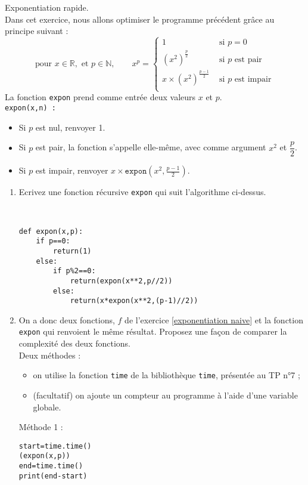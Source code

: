 \begin{exercice}\label{exp rapide}Exponentiation rapide.\\
Dans cet exercice, nous allons optimiser le programme précédent grâce au principe suivant :
\[\text{pour }x\in\mathbb{R},\text{ et }p\in \mathbb{N},\qquad x^p=\left\lbrace
\begin{array}{ll}
1&\text{ si }p=0\\
\left(x^2\right)^{\frac{p}{2}}&\text{ si }p\text{ est pair}\\
x\times \left(x^2\right)^{\frac{p-1}{2}}&\text{ si }p\text{ est impair}\\
\end{array}\right.\]
La fonction \verb?expon? prend comme entrée deux valeurs $x$ et $p$.\\
\verb?expon(x,n) : ?
\begin{itemize}
\item Si $p$ est nul, renvoyer 1.
\item Si $p$ est pair, la fonction s'appelle elle-même, avec comme argument $x^2$ et $\dfrac{p}{2}$.
\item Si $p$ est impair, renvoyer $x\times \texttt{expon}(x^2,\frac{p-1}{2})$.
\end{itemize}
\begin{enumerate}
\item Ecrivez une fonction récursive \verb?expon? qui suit l'algorithme ci-dessus.
\begin{solution}~\\
\vspace{-0.7cm}
\begin{verbatim}
def expon(x,p):
    if p==0:
        return(1)
    else:
        if p%2==0:
            return(expon(x**2,p//2))
        else:
            return(x*expon(x**2,(p-1)//2))
\end{verbatim}
\end{solution}
\item On a donc deux fonctions, $f$ de l'exercice \ref{exponentiation naive} et la fonction \verb?expon? qui renvoient le même résultat. Proposez une façon de comparer la complexité des deux fonctions. \\
Deux méthodes :
\begin{itemize}
\item on utilise la fonction \verb?time? de la bibliothèque \verb?time?, présentée au TP n°7 ;
\item (facultatif) on ajoute un compteur au programme à l'aide d'une variable globale.
\end{itemize} 
\begin{solution}
\newpage
Méthode 1 :\\
\begin{verbatim}
start=time.time()
(expon(x,p))
end=time.time()
print(end-start)
        

\end{verbatim}
\end{solution}
\end{enumerate}
\end{exercice}
